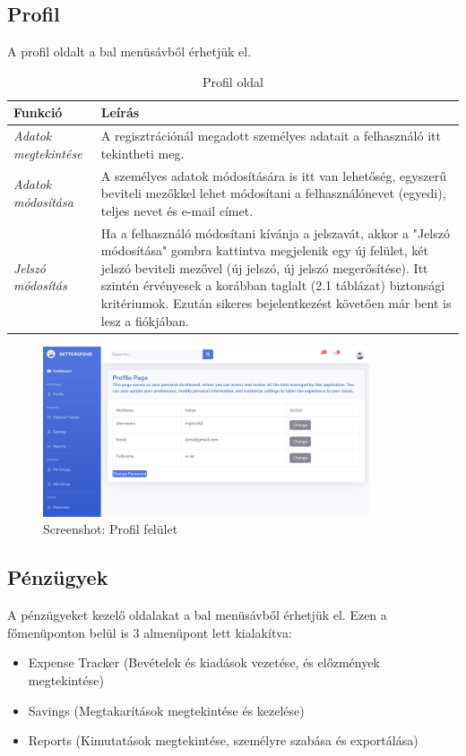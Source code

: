 \subsection{Profil}
A profil oldalt a bal menüsávből érhetjük el.
\begin{table}[H]
	\centering
	\begin{tabular}{ | m{} | m{} | }
		\hline
		\textbf{Funkció} & \textbf{Leírás} \\
		\hline \hline
		\emph{Adatok megtekintése} & A regisztrációnál megadott személyes adatait a felhasználó itt tekintheti meg. \\
		\hline
		\emph{Adatok módosítása} &  A személyes adatok módosítására is itt van lehetőség, egyszerű beviteli mezőkkel lehet módosítani a felhasználónevet (egyedi), teljes nevet és e-mail címet.  \\
		\hline
		\emph{Jelszó módosítás} & Ha a felhasználó módosítani kívánja a jelszavát, akkor a "Jelszó módosítása" gombra kattintva megjelenik egy új felület, két jelszó beviteli mezővel (új jelszó, új jelszó megerősítése). Itt szintén érvényesek a korábban taglalt (2.1 táblázat) biztonsági kritériumok. Ezután sikeres bejelentkezést követően már bent is lesz a fiókjában. \\
		\hline
	\end{tabular}
	\caption{Profil oldal}
	\label{tab:example-1}
\end{table}

\begin{figure}[H]
	\centering
	\includegraphics[height=190px]{img/profile-screenshot}
	\caption{Screenshot: Profil felület}
	\label{fig:example-1}
\end{figure}

\subsection{Pénzügyek}
A pénzügyeket kezelő oldalakat a bal menüsávből érhetjük el. Ezen a főmenüponton belül is 3 almenüpont lett kialakítva: 
\begin{itemize}
	\item Expense Tracker (Bevételek és kiadások vezetése, és előzmények megtekintése)
	\item Savings (Megtakarítások megtekintése és kezelése)
	\item Reports (Kimutatások megtekintése, személyre szabása és exportálása)
\end{itemize}

